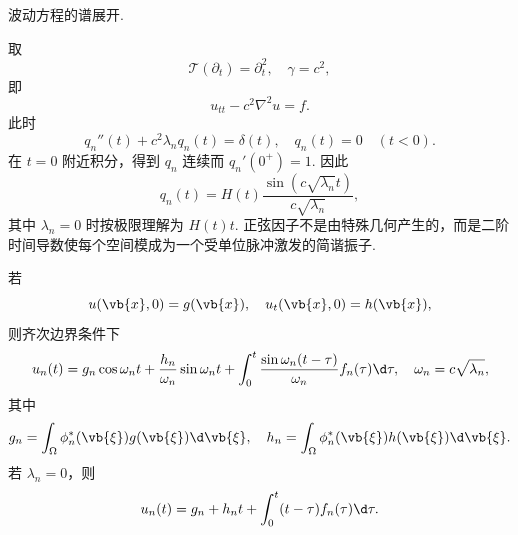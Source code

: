 \begin{example}
	波动方程的谱展开.
	
	取
	\begin{equation*}
		\mathcal{T}(\partial_t)=\partial_t^2,
		\quad \gamma=c^2,
	\end{equation*}
	即
	\begin{equation*}
		u_{tt}-c^2\nabla^2u=f.
	\end{equation*}
	此时
	\begin{equation*}
		q_n''(t)+c^2\lambda_nq_n(t)=\delta(t),
		\quad q_n(t)=0\quad(t<0).
	\end{equation*}
	在 \(t=0\) 附近积分，得到 \(q_n\) 连续而 \(q_n'(0^+)=1\). 因此
	\begin{equation*}
		q_n(t)=H(t)\frac{\sin(c\sqrt{\lambda_n}t)}{c\sqrt{\lambda_n}},
	\end{equation*}
	其中 \(\lambda_n=0\) 时按极限理解为 \(H(t)t\). 正弦因子不是由特殊几何产生的，而是二阶时间导数使每个空间模成为一个受单位脉冲激发的简谐振子.
	
	若
	\begin{equation*}
		u(\vb{x},0)=g(\vb{x}),
		\quad u_t(\vb{x},0)=h(\vb{x}),
	\end{equation*}
	则齐次边界条件下
	\begin{equation*}
		u_n(t)=g_n\cos\omega_nt+\frac{h_n}{\omega_n}\sin\omega_nt
		+\int_0^t\frac{\sin\omega_n(t-\tau)}{\omega_n}f_n(\tau)\d\tau,
		\quad \omega_n=c\sqrt{\lambda_n},
	\end{equation*}
	其中
	\begin{equation*}
		g_n=\int_\Omega\phi_n^*(\vb{\xi})g(\vb{\xi})\d\vb{\xi},
		\quad
		h_n=\int_\Omega\phi_n^*(\vb{\xi})h(\vb{\xi})\d\vb{\xi}.
	\end{equation*}
	若 \(\lambda_n=0\)，则
	\begin{equation*}
		u_n(t)=g_n+h_nt+\int_0^t(t-\tau)f_n(\tau)\d\tau.
	\end{equation*}
\end{example}

